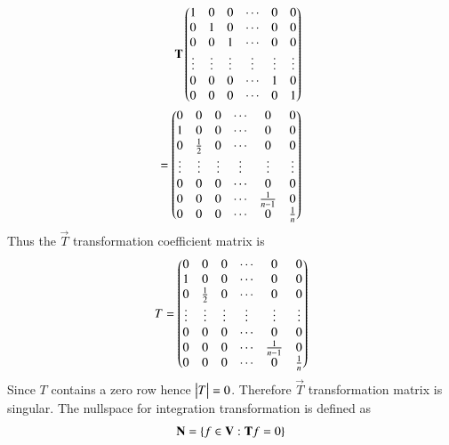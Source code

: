 \begin{enumerate}[label=\emph{\alph*)}]
\begin{align}
                        \mathbf{T}\begin{pmatrix}1 & 0 & 0 & \cdots & 0 & 0\\
                                      0 & 1 & 0 & \cdots & 0 & 0 \\
                                      0 & 0 & 1 & \cdots & 0 & 0 \\
                                      \vdots & \vdots & \vdots & \vdots & \vdots & \vdots\\
                                      0 & 0 & 0 & \cdots & 1 & 0 \\
                                      0 & 0 & 0 & \cdots & 0 & 1\end{pmatrix} \\
                              =\begin{pmatrix}0 & 0 & 0 & \cdots & 0 & 0\\
                                      1 & 0 & 0 & \cdots & 0 & 0\\
				      0 & \frac{1}{2} & 0 & \cdots & 0 & 0\\
                                      \vdots & \vdots & \vdots & \vdots & \vdots & \vdots\\
				      0 & 0 & 0 & \cdots & 0 & 0 \\
				      0 & 0 & 0 & \cdots & \frac{1}{n-1} & 0 \\
				      0 & 0 & 0 & \cdots & 0 & \frac{1}{n} \end{pmatrix}
                \end{align}
Thus the $\vec{T}$ transformation coefficient matrix is
\begin{align}
	                     T=\begin{pmatrix}0 & 0 & 0 & \cdots & 0 & 0\\
                                      1 & 0 & 0 & \cdots & 0 & 0\\
                                      0 & \frac{1}{2} & 0 & \cdots & 0 & 0\\
                                      \vdots & \vdots & \vdots & \vdots & \vdots & \vdots\\
                                      0 & 0 & 0 & \cdots & 0 & 0 \\
                                      0 & 0 & 0 & \cdots & \frac{1}{n-1} & 0 \\
                                      0 & 0 & 0 & \cdots & 0 & \frac{1}{n} \end{pmatrix} 
\end{align}
Since $T$ contains a zero row hence $\begin{vmatrix}T\end{vmatrix}=0$. Therefore $\vec{T}$ transformation matrix is 
singular.
The nullspace for integration transformation is defined as
\begin{align}
        \mathbf{N}=\left\{f \in \mathbf{V} : \mathbf{T}f=0\right\}
\end{align}

\end{enumerate}
